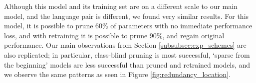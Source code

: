 Although this model and its training set are on a different scale to our main model, 
and the language pair is different, 
we found very similar results. 
For this model, it is possible to prune 60\% of parameters with no immediate performance loss,
and with retraining it is possible to prune 90\%, and regain original performance.
Our main observations from Section \ref{subsubsec:exp_schemes} %
are also replicated; in particular, class-blind pruning is most successful,
`sparse from the beginning' models are less successful than pruned and retrained models,
and we observe the same patterns as seen in Figure \ref{fig:redundancy_location}.


